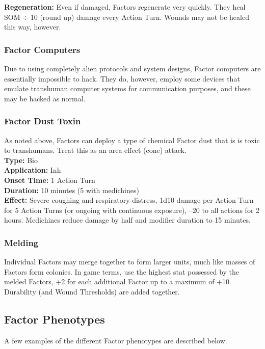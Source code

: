 \textbf{Regeneration: }Even if damaged, Factors regenerate 
very quickly. They heal SOM $\div$ 10 (round up) damage 
every Action Turn. Wounds may not be healed this 
way, however. 

\subsubsection{Factor Computers}

Due to using completely alien protocols and system 
designs, Factor computers are essentially impossible 
to hack. They do, however, employ some devices that 
emulate transhuman computer systems for communication
purposes, and these may be hacked as normal.

\subsubsection{Factor Dust Toxin}

As noted above, Factors can deploy a type of chemical 
Factor dust that is is toxic to transhumans. Treat this 
as an area effect (cone) attack. \\
\textbf{Type:} Bio \\
\textbf{Application:} Inh \\
\textbf{Onset Time:} 1 Action Turn \\
\textbf{Duration:} 10 minutes (5 with medichines) \\
\textbf{Effect:} Severe coughing and respiratory distress, 1d10 damage per Action Turn for 5 Action Turns (or ongoing with continuous exposure), –20 to all actions for 2 hours. Medichines reduce damage by half and modifier duration to 15 minutes. 

\subsubsection{Melding}

Individual Factors may merge together to form larger 
units, much like masses of Factors form colonies. In 
game terms, use the highest stat possessed by the 
melded Factors, +2 for each additional Factor up to a 
maximum of +10. Durability (and Wound Thresholds) 
are added together.

\subsection{Factor Phenotypes }

A few examples of the different Factor phenotypes are 
described below.


